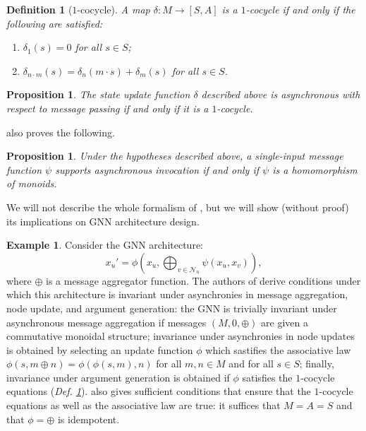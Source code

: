 \documentclass[11pt,a4paper,openright,twoside]{report}
\newcounter{mycounter}
\theoremstyle{plain}
\newtheorem{proposition}[mycounter]{Proposition}
\newtheorem{definition}[mycounter]{Definition}
\theoremstyle{definition}
\newtheorem{example}[mycounter]{Example}
\begin{document}
\begin{definition}[$1$-cocycle]
  A map $\delta: M \to [S,A]$ is a $1$-cocycle if and only if the following are satisfied:
  \begin{enumerate}
    \item $\delta_1(s) = 0$ for all $s \in S$;
    \item $\delta_{n \cdot m}(s) = \delta_{n}(m \cdot s) + \delta_m(s)$ for all $s \in S$.
  \end{enumerate} 
  \label{def: cocycle}
\end{definition}

\begin{proposition}
  The state update function $\delta$ described above is asynchronous with respect to message passing if and only if it is a $1$-cocycle.
\end{proposition}

\cite{dudzik2024asynchronous} also proves the following.

\begin{proposition}
  Under the hypotheses described above, a single-input message function $\psi$ supports asynchronous invocation if and only if $\psi$ is a homomorphism of monoids.
\end{proposition}

We will not describe the whole formalism of \cite{dudzik2024asynchronous}, but we will show (without proof) its implications on GNN architecture design. 

\begin{example}
  Consider the GNN architecture:
  \[x_u' = \phi\left(x_u, \bigoplus_{v \in \mathcal{N}_u}\psi(x_{u},x_{v})\right),\]
  where $\oplus$ is a message aggregator function. The authors of \cite{dudzik2024asynchronous} derive conditions under which this architecture is invariant under asynchronies in message aggregation, node update, and argument generation: the GNN is trivially invariant under asynchronous message aggregation if messages $(M,0,\oplus)$ are given a commutative monoidal structure; invariance under asynchronies in node updates is obtained by selecting an update function $\phi$ which sastifies the associative law $\phi(s,m \oplus n) = \phi(\phi(s,m),n)$ for all $m,n \in M$ and for all $s \in S$; finally, invariance under argument generation is obtained if $\phi$ satisfies the $1$-cocycle equations (\textit{Def. \ref{def: cocycle}}). \cite{dudzik2024asynchronous} also gives sufficient conditions that ensure that the $1$-cocycle equations as well as the associative law are true: it suffices that $M=A=S$ and that $\phi=\oplus$ is idempotent.
\end{example}
\end{document}
